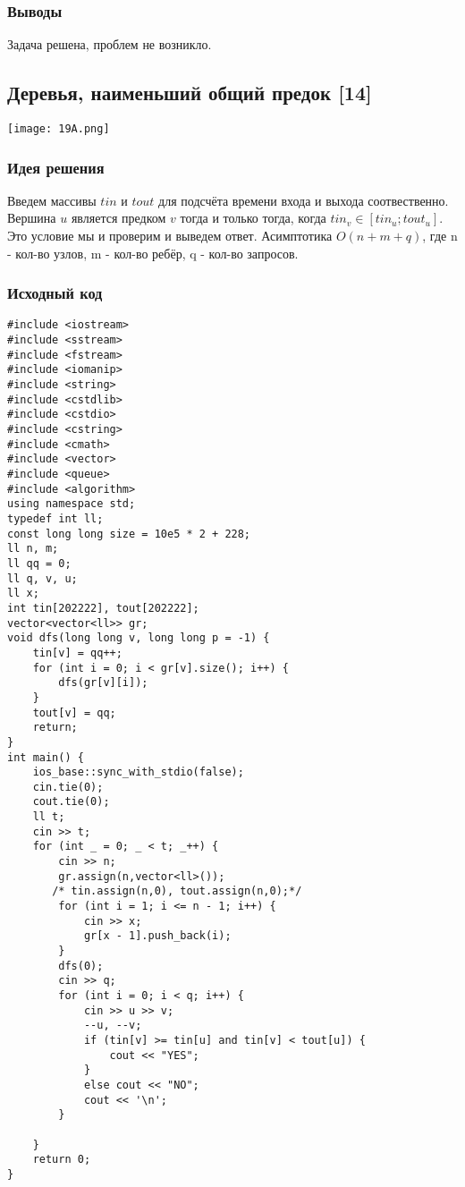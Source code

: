 \documentclass[12pt]{article}
\begin{document}
\subsubsection*{Выводы}
Задача решена, проблем не возникло. 
\subsection*{Деревья, наименьший общий предок [14]}
\begin{center}
\texttt{[image: 19A.png]}
\end{center}
\subsubsection*{Идея решения}
Введем массивы $tin$ и $tout$ для подсчёта времени входа и выхода соотвественно. Вершина $u$ является предком $v$ тогда и только тогда, когда $tin_v \in [tin_u; tout_u]$. Это условие мы и проверим и выведем ответ. Асимптотика $O(n+m+q)$, где n - кол-во узлов, m - кол-во ребёр, q - кол-во запросов. 
\subsubsection*{Исходный код}
\begin{lstlisting}
#include <iostream>
#include <sstream>
#include <fstream>
#include <iomanip>
#include <string>
#include <cstdlib>
#include <cstdio>
#include <cstring>
#include <cmath>
#include <vector>
#include <queue>
#include <algorithm>
using namespace std;
typedef int ll;
const long long size = 10e5 * 2 + 228;
ll n, m;
ll qq = 0;
ll q, v, u;
ll x;
int tin[202222], tout[202222];
vector<vector<ll>> gr;
void dfs(long long v, long long p = -1) {
    tin[v] = qq++;
    for (int i = 0; i < gr[v].size(); i++) {
        dfs(gr[v][i]);
    }
    tout[v] = qq;
    return;
}
int main() {
    ios_base::sync_with_stdio(false);
    cin.tie(0);
    cout.tie(0);
    ll t;
    cin >> t;
    for (int _ = 0; _ < t; _++) {
        cin >> n;
        gr.assign(n,vector<ll>());
       /* tin.assign(n,0), tout.assign(n,0);*/
        for (int i = 1; i <= n - 1; i++) {
            cin >> x;
            gr[x - 1].push_back(i);
        }
        dfs(0);
        cin >> q;
        for (int i = 0; i < q; i++) {
            cin >> u >> v;
            --u, --v;
            if (tin[v] >= tin[u] and tin[v] < tout[u]) {
                cout << "YES";
            }
            else cout << "NO";
            cout << '\n';
        }
      
    }
    return 0;
}
\end{lstlisting}
\end{document}
